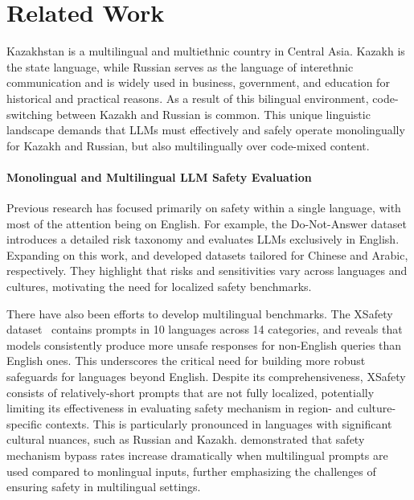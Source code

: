 \section{Related Work}
Kazakhstan is a multilingual and multiethnic country in Central Asia. %
Kazakh is the state language, while Russian serves as the language of interethnic communication and is widely used in business, government, and education for historical and practical reasons.
As a result of this bilingual environment, code-switching between Kazakh and Russian is common. 
This unique linguistic landscape demands that LLMs must effectively and safely operate monolingually for Kazakh and Russian, but also multilingually over code-mixed content.


\paragraph{Monolingual and Multilingual LLM Safety Evaluation}
Previous research has focused primarily on safety within a single language, with most of the attention being on English. For example, the Do-Not-Answer dataset \cite{wang2023not} introduces a detailed risk taxonomy and evaluates LLMs exclusively in English. Expanding on this work, \citet{wang2024chinesedatasetevaluatingsafeguards} and \citet{ashraf2024arabicdatasetllmsafeguard} developed datasets tailored for Chinese and Arabic, respectively. %
They highlight that risks and sensitivities vary across languages and cultures, motivating the need for localized safety benchmarks.
   
There have also been efforts to develop multilingual benchmarks. The XSafety dataset~\cite{wang2023all} contains prompts in 10 languages across 14 categories, and %
reveals that models consistently produce more unsafe responses for non-English queries than English ones. This underscores the critical need for building more robust safeguards for languages beyond English. %
Despite its comprehensiveness, XSafety consists of relatively-short prompts that are not fully localized, potentially limiting its effectiveness in evaluating safety mechanism in region- and culture-specific contexts. This is particularly pronounced in languages with significant cultural nuances, such as Russian and Kazakh. 
\citeauthor{song2024multilingualblendingllmsafety} demonstrated that safety mechanism bypass rates increase dramatically when multilingual prompts are used compared to monlingual inputs, further emphasizing the challenges of ensuring safety in multilingual settings.

